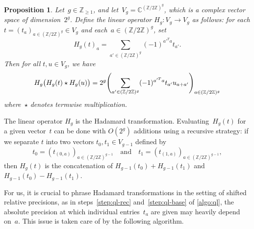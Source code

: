 \documentclass[12pt,oneside]{amsart}
\numberwithin{equation}{section}
\newtheorem{prop}[equation]{Proposition}
\theoremstyle{definition}
\newcommand{\Z}{\mathbb{Z}}
\newcommand{\C}{\mathbb{C}}
\DeclarePairedDelimiter{\paren}{(}{)}
\begin{document}
\begin{prop}
  \label{prop:hadamard}
  Let~$g\in \Z_{\geq 1}$, and let~$V_g = \C^{(\Z/2\Z)^g}$, which is a complex
  vector space of dimension~$2^g$. Define the linear operator $H_g: V_g\to V_g$ as
  follows: for each $t = (t_a)_{a\in (\Z/2\Z)^g} \in V_g$ and
  each~$a\in (\Z/2\Z)^g$, set
  \begin{displaymath}
    H_g(t)_a = \sum_{a'\in (\Z/2\Z)^g} (-1)^{a'^T a} t_{a'}.
  \end{displaymath}
  Then for all $t,u\in V_g$, we have
  \begin{displaymath}
    H_g \paren[\big]{H_g (t) \star H_g (u)} = 2^g \paren[\Bigg]{\sum_{a'\in (\Z/2\Z)^g}
      (-1)^{a'^T a} t_{a'} u_{a+a'}}_{a\in (\Z/2\Z)^g}
  \end{displaymath}
  where~$\star$ denotes termwise multiplication.
\end{prop}


The linear operator $H_g$ is the Hadamard transformation. Evaluating~$H_g(t)$
for a given vector~$t$ can be done with $O(2^g)$ additions using a recursive
strategy: if we separate $t$ into two vectors $t_0,t_1\in V_{g-1}$ defined by
\begin{equation}
  \label{eq:rec-hadamard}
  t_0 = (t_{(0,a)})_{a\in (\Z/2\Z)^{g-1}} \quad \text{and} \quad t_1 = (t_{(1,a)})_{a\in (\Z/2\Z)^{g-1}},
\end{equation}
then $H_g(t)$ is the concatenation of $H_{g-1}(t_0) + H_{g-1} (t_1)$ and
$H_{g-1} (t_0) - H_{g-1} (t_1)$.

For us, it is crucial to phrase Hadamard transformations in the setting of
shifted relative precisions, as in steps~\eqref{step:ql-rec}
and~\eqref{step:ql-base} of \cref{algo:ql}, the absolute precision at which
individual entries~$t_a$ are given may heavily depend on~$a$. This issue is
taken care of by the following algorithm.
\end{document}
